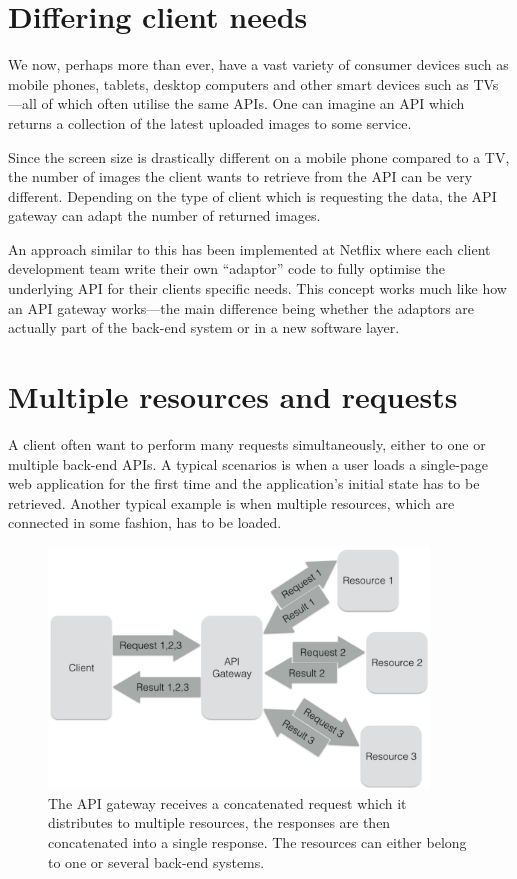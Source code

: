 \documentclass{cslthse-msc}
\begin{document}
\section{Differing client needs}
We now, perhaps more than ever, have a vast variety of consumer devices such as mobile phones, tablets, desktop computers and other smart devices such as TVs---all of which often utilise the same APIs. One can imagine an API which returns a collection of the latest uploaded images to some service. 

Since the screen size is drastically different on a mobile phone compared to a TV, the number of images the client wants to retrieve from the API can be very different. Depending on the type of client which is requesting the data, the API gateway can adapt the number of returned images.

An approach similar to this has been implemented at Netflix where each client development team write their own \enquote{adaptor} code to fully optimise the underlying API for their clients specific needs\cite{netflix}. This concept works much like how an API gateway works---the main difference being whether the adaptors are actually part of the back-end system or in a new software layer.

\section{Multiple resources and requests}
A client often want to perform many requests simultaneously, either to one or multiple back-end APIs. A typical scenarios is when a user loads a single-page web application for the first time and the application's initial state has to be retrieved. Another typical example is when multiple resources, which are connected in some fashion, has to be loaded.

\begin{figure}[H]
  \centering
    \begin{center}
      \includegraphics[width=0.9\textwidth]{images/api_gateway_concatenation.png}
    \end{center}
  \caption{The API gateway receives a concatenated request which it distributes to multiple resources, the responses are then concatenated into a single response. The resources can either belong to one or several back-end systems.}
\end{figure}
\end{document}
